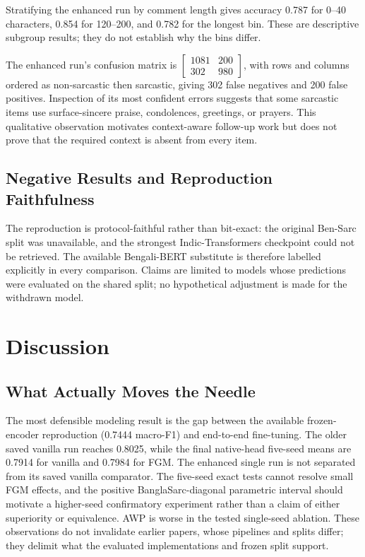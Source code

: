 \documentclass{ieeeaccess}
\begin{document}
Stratifying the enhanced run by comment length gives accuracy 0.787 for 0--40 characters, 0.854 for 120--200, and 0.782 for the longest bin. These are descriptive subgroup results; they do not establish why the bins differ.

The enhanced run's confusion matrix is $\left[\begin{smallmatrix}1081&200\\302&980\end{smallmatrix}\right]$, with rows and columns ordered as non-sarcastic then sarcastic, giving 302 false negatives and 200 false positives. Inspection of its most confident errors suggests that some sarcastic items use surface-sincere praise, condolences, greetings, or prayers. This qualitative observation motivates context-aware follow-up work but does not prove that the required context is absent from every item.

\subsection{Negative Results and Reproduction Faithfulness}
\label{sec:negative-results}

The reproduction is protocol-faithful rather than bit-exact: the original Ben-Sarc split was unavailable, and the strongest Indic-Transformers checkpoint could not be retrieved. The available Bengali-BERT substitute is therefore labelled explicitly in every comparison. Claims are limited to models whose predictions were evaluated on the shared split; no hypothetical adjustment is made for the withdrawn model.

\section{Discussion}
\label{sec:discussion}

\subsection{What Actually Moves the Needle}
\label{sec:discussion-win}

The most defensible modeling result is the gap between the available frozen-encoder reproduction (0.7444 macro-F1) and end-to-end fine-tuning. The older saved vanilla run reaches 0.8025, while the final native-head five-seed means are 0.7914 for vanilla and 0.7984 for FGM. The enhanced single run is not separated from its saved vanilla comparator. The five-seed exact tests cannot resolve small FGM effects, and the positive BanglaSarc-diagonal parametric interval should motivate a higher-seed confirmatory experiment rather than a claim of either superiority or equivalence. AWP is worse in the tested single-seed ablation. These observations do not invalidate earlier papers, whose pipelines and splits differ; they delimit what the evaluated implementations and frozen split support.
\end{document}
